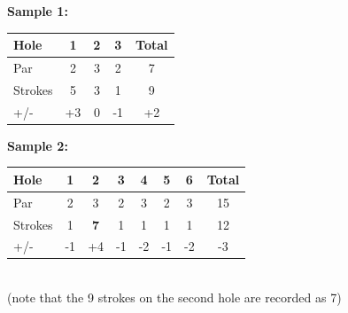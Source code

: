\begin{figure}[!htb]
{\bf Sample 1:}\\
\begin{tabular}{||l|c|c|c||c||}\hline \hline
Hole & 1 & 2 & 3 & Total \\ \hline \hline
Par & 2 & 3 & 2 & 7 \\ \hline 
Strokes & 5 & 3 & 1 & 9 \\ \hline
+/- & +3 & 0 & -1 & +2 \\ \hline \hline
\end{tabular}
\endminipage\hfill
{}
{\bf Sample 2:}\\
\begin{tabular}{||l|c|c|c|c|c|c||c||}\hline \hline
Hole & 1 & 2 & 3 & 4 & 5 & 6 & Total \\ \hline \hline
Par & 2 & 3 & 2 & 3 & 2 & 3 & 15 \\ \hline 
Strokes & 1 & {\bf 7} & 1 & 1 & 1 & 1 & 12 \\ \hline
+/- & -1 & +4 & -1 & -2 & -1 & -2 & -3\\ \hline \hline
\end{tabular}\\
(note that the 9 strokes on the second hole are recorded as 7)
\endminipage\hfill
\end{figure}
